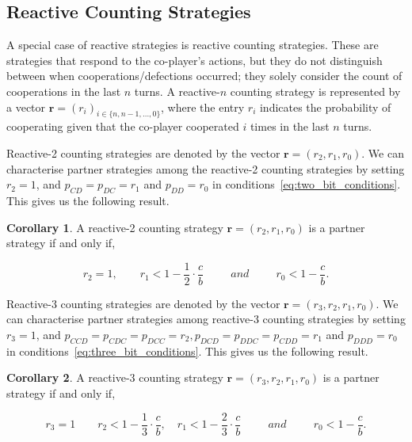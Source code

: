 \documentclass[11pt]{article}
\theoremstyle{definition}
\newtheorem{corollary}{Corollary}[theorem]
\begin{document}
\subsection{Reactive Counting Strategies}

A special case of reactive strategies is reactive counting strategies. These are
strategies that respond to the co-player's actions, but they do not distinguish
between when cooperations/defections occurred; they solely consider the count of
cooperations in the last $n$ turns. A reactive-$n$ counting strategy is represented
by a vector $\mathbf{r}=(r_i)_{i \in \{n, n -1, \dots, 0\}}$, where the entry \(r_i\)
indicates the probability of cooperating given that the co-player cooperated
\(i\) times in the last \(n\) turns.

Reactive-2 counting strategies are denoted by the vector $\mathbf{r}=(r_2,
r_1, r_0)$. We can characterise partner strategies among the reactive-2
counting strategies by setting $r_2 = 1$, and $p_{CD} = p_{DC} = r_1$ and
$p_{DD} = r_0$ in conditions~\eqref{eq:two_bit_conditions}. This gives us the
following result.

\begin{corollary}
A reactive-2 counting strategy $\mathbf{r} = (r_2, r_1, r_0)$ is a partner strategy if and only if,

\begin{equation}\label{eq:counting_two_bit_conditions}
  \displaystyle r_2 = 1, \qquad r_1 < 1-\frac{1}{2} \cdot \frac{c}{b} \qquad ~~and~~ \qquad r_0 < 1\!-\! \frac{c}{b}.
\end{equation}
\end{corollary}

Reactive-3 counting strategies are denoted by the vector $\mathbf{r}=(r_3,
r_2, r_1, r_0)$. We can characterise partner strategies among reactive-3
counting strategies by setting $r_3 = 1$, and $p_{CCD} = p_{CDC} = p_{DCC} =
r_2, p_{DCD} = p_{DDC} = p_{CDD} = r_1$ and $p_{DDD} = r_0$ in
conditions~\eqref{eq:three_bit_conditions}. This gives us the following result.

\begin{corollary}
A reactive-3 counting strategy $\mathbf{r} = (r_3, r_2, r_1, r_0)$ is a partner strategy if and only if,

\begin{equation}\label{eq:counting_three_bit_conditions}
  \displaystyle r_3 = 1 \qquad r_2 < 1- \frac{1}{3} \cdot \frac{c}{b}, \quad r_1 < 1- \frac{2}{3} \cdot \frac{c}{b} \qquad ~~and~~ \qquad r_0 < 1\!-\! \frac{c}{b}.
\end{equation}
\end{corollary}
\end{document}
